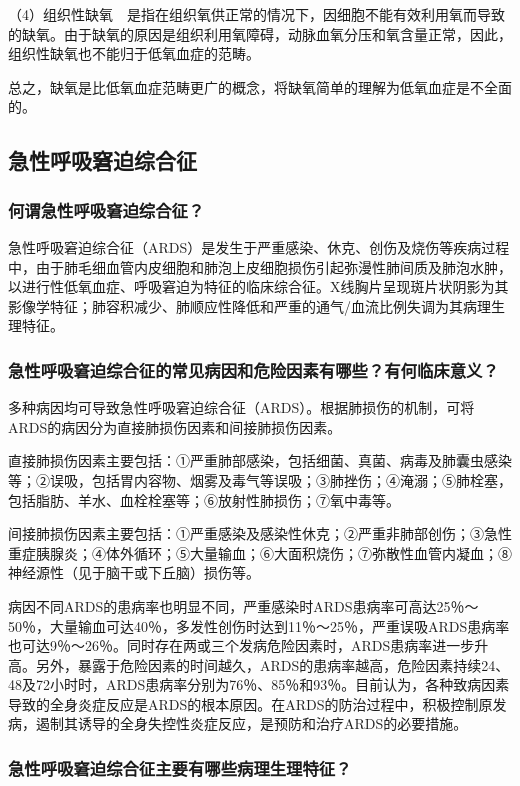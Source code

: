 （4）组织性缺氧　是指在组织氧供正常的情况下，因细胞不能有效利用氧而导致的缺氧。由于缺氧的原因是组织利用氧障碍，动脉血氧分压和氧含量正常，因此，组织性缺氧也不能归于低氧血症的范畴。

总之，缺氧是比低氧血症范畴更广的概念，将缺氧简单的理解为低氧血症是不全面的。

\subsection{急性呼吸窘迫综合征}

\subsubsection{何谓急性呼吸窘迫综合征？}

急性呼吸窘迫综合征（ARDS）是发生于严重感染、休克、创伤及烧伤等疾病过程中，由于肺毛细血管内皮细胞和肺泡上皮细胞损伤引起弥漫性肺间质及肺泡水肿，以进行性低氧血症、呼吸窘迫为特征的临床综合征。X线胸片呈现斑片状阴影为其影像学特征；肺容积减少、肺顺应性降低和严重的通气/血流比例失调为其病理生理特征。

\subsubsection{急性呼吸窘迫综合征的常见病因和危险因素有哪些？有何临床意义？}

多种病因均可导致急性呼吸窘迫综合征（ARDS）。根据肺损伤的机制，可将ARDS的病因分为直接肺损伤因素和间接肺损伤因素。

直接肺损伤因素主要包括：①严重肺部感染，包括细菌、真菌、病毒及肺囊虫感染等；②误吸，包括胃内容物、烟雾及毒气等误吸；③肺挫伤；④淹溺；⑤肺栓塞，包括脂肪、羊水、血栓栓塞等；⑥放射性肺损伤；⑦氧中毒等。

间接肺损伤因素主要包括：①严重感染及感染性休克；②严重非肺部创伤；③急性重症胰腺炎；④体外循环；⑤大量输血；⑥大面积烧伤；⑦弥散性血管内凝血；⑧神经源性（见于脑干或下丘脑）损伤等。

病因不同ARDS的患病率也明显不同，严重感染时ARDS患病率可高达25％～50％，大量输血可达40％，多发性创伤时达到11％～25％，严重误吸ARDS患病率也可达9％～26％。同时存在两或三个发病危险因素时，ARDS患病率进一步升高。另外，暴露于危险因素的时间越久，ARDS的患病率越高，危险因素持续24、48及72小时时，ARDS患病率分别为76％、85％和93％。目前认为，各种致病因素导致的全身炎症反应是ARDS的根本原因。在ARDS的防治过程中，积极控制原发病，遏制其诱导的全身失控性炎症反应，是预防和治疗ARDS的必要措施。

\subsubsection{急性呼吸窘迫综合征主要有哪些病理生理特征？}

